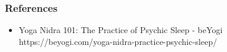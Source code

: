 \begin{frame}[fragile]\frametitle{References}
	\begin{itemize}
	\item Yoga Nidra 101: The Practice of Psychic Sleep - beYogi https://beyogi.com/yoga-nidra-practice-psychic-sleep/
	\end{itemize}

\end{frame}

